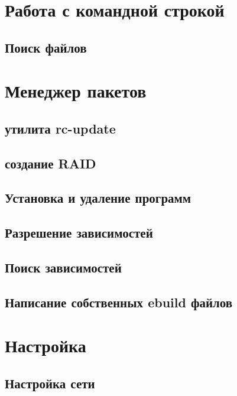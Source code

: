 \documentclass[12pt, a4paper]{article}
\begin{document}
\newpage 

\section{Работа с командной строкой}

\subsection{Поиск файлов}

\newpage

\section{Менеджер пакетов}

\subsection{утилита rc-update}

\subsection{создание RAID}

\subsection{Установка и удаление программ}

\subsection{Разрешение зависимостей}

\subsection{Поиск зависимостей}

\subsection{Написание собственных ebuild файлов}

\newpage
\section{Настройка}

\subsection{Настройка сети}
\end{document}
